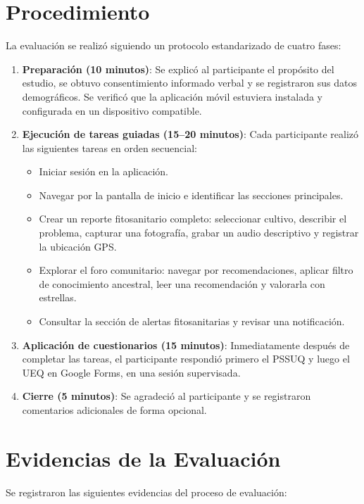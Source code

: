 \documentclass[a4paper,12pt]{report}
\begin{document}
\section{Procedimiento}

La evaluación se realizó siguiendo un protocolo estandarizado de cuatro fases:

\begin{enumerate}
    \item \textbf{Preparación (10 minutos)}: Se explicó al participante el propósito del estudio, se obtuvo consentimiento informado verbal y se registraron sus datos demográficos. Se verificó que la aplicación móvil estuviera instalada y configurada en un dispositivo compatible.
    \item \textbf{Ejecución de tareas guiadas (15--20 minutos)}: Cada participante realizó las siguientes tareas en orden secuencial:
    \begin{itemize}
        \item Iniciar sesión en la aplicación.
        \item Navegar por la pantalla de inicio e identificar las secciones principales.
        \item Crear un reporte fitosanitario completo: seleccionar cultivo, describir el problema, capturar una fotografía, grabar un audio descriptivo y registrar la ubicación GPS.
        \item Explorar el foro comunitario: navegar por recomendaciones, aplicar filtro de conocimiento ancestral, leer una recomendación y valorarla con estrellas.
        \item Consultar la sección de alertas fitosanitarias y revisar una notificación.
    \end{itemize}
    \item \textbf{Aplicación de cuestionarios (15 minutos)}: Inmediatamente después de completar las tareas, el participante respondió primero el PSSUQ y luego el UEQ en Google Forms, en una sesión supervisada.
    \item \textbf{Cierre (5 minutos)}: Se agradeció al participante y se registraron comentarios adicionales de forma opcional.
\end{enumerate}


\section{Evidencias de la Evaluación}

Se registraron las siguientes evidencias del proceso de evaluación:
\end{document}
